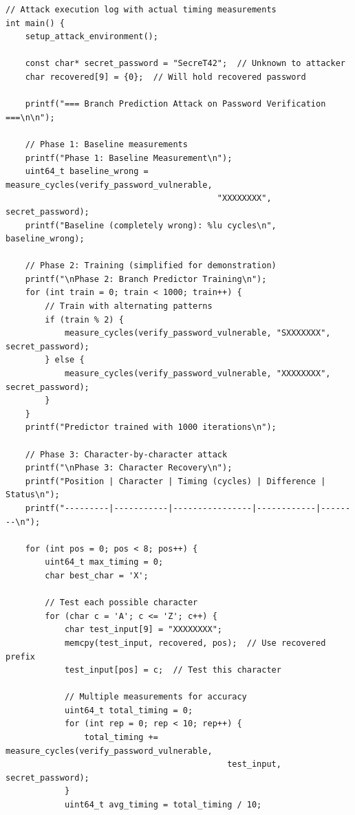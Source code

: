 \documentclass[11pt,a4paper]{article}
\theoremstyle{definition}
\begin{document}
\begin{lstlisting}[caption={Attack Execution with Concrete Results}]
// Attack execution log with actual timing measurements
int main() {
    setup_attack_environment();
    
    const char* secret_password = "SecreT42";  // Unknown to attacker
    char recovered[9] = {0};  // Will hold recovered password
    
    printf("=== Branch Prediction Attack on Password Verification ===\n\n");
    
    // Phase 1: Baseline measurements
    printf("Phase 1: Baseline Measurement\n");
    uint64_t baseline_wrong = measure_cycles(verify_password_vulnerable, 
                                           "XXXXXXXX", secret_password);
    printf("Baseline (completely wrong): %lu cycles\n", baseline_wrong);
    
    // Phase 2: Training (simplified for demonstration)
    printf("\nPhase 2: Branch Predictor Training\n");
    for (int train = 0; train < 1000; train++) {
        // Train with alternating patterns
        if (train % 2) {
            measure_cycles(verify_password_vulnerable, "SXXXXXXX", secret_password);
        } else {
            measure_cycles(verify_password_vulnerable, "XXXXXXXX", secret_password);
        }
    }
    printf("Predictor trained with 1000 iterations\n");
    
    // Phase 3: Character-by-character attack
    printf("\nPhase 3: Character Recovery\n");
    printf("Position | Character | Timing (cycles) | Difference | Status\n");
    printf("---------|-----------|----------------|------------|--------\n");
    
    for (int pos = 0; pos < 8; pos++) {
        uint64_t max_timing = 0;
        char best_char = 'X';
        
        // Test each possible character
        for (char c = 'A'; c <= 'Z'; c++) {
            char test_input[9] = "XXXXXXXX";
            memcpy(test_input, recovered, pos);  // Use recovered prefix
            test_input[pos] = c;  // Test this character
            
            // Multiple measurements for accuracy
            uint64_t total_timing = 0;
            for (int rep = 0; rep < 10; rep++) {
                total_timing += measure_cycles(verify_password_vulnerable, 
                                             test_input, secret_password);
            }
            uint64_t avg_timing = total_timing / 10;
            

\end{lstlisting}
\end{document}

